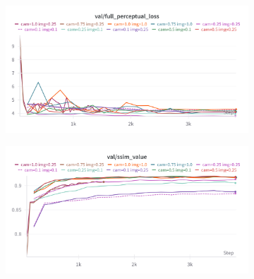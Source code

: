\begin{figure}[htbp]
  \centering
  \begin{subfigure}[b]{0.48\textwidth}
    \centering
    \includegraphics[width=\textwidth]{images/experiments/cam_img/perceptual.png}
    \label{fig:exp_cond_perceptual}
  \end{subfigure}
  \hfill
  \begin{subfigure}[b]{0.48\textwidth}
    \centering
    \includegraphics[width=\textwidth]{images/experiments/cam_img/ssim.png}
    \label{fig:exp_cond_ssim}
  \end{subfigure}


\end{figure}
